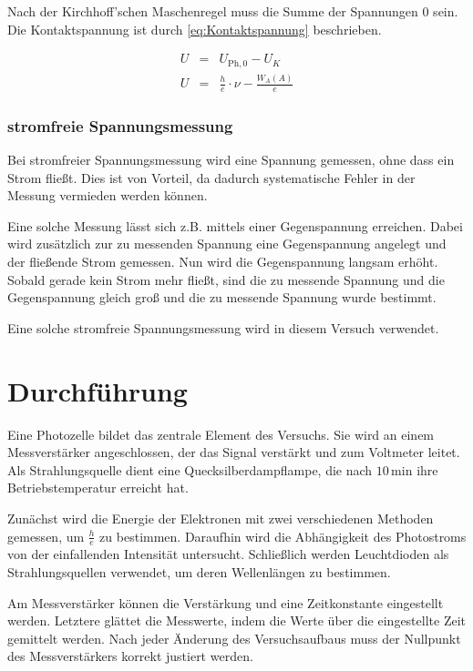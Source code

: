 \documentclass[12pt,a4paper]{scrartcl}
\numberwithin{equation}{section} %
\begin{document}
Nach der Kirchhoff'schen Maschenregel muss die Summe der Spannungen $0$ sein. Die Kontaktspannung ist durch \eqref{eq:Kontaktspannung} beschrieben.

\begin{eqnarray}
	U &=& U_{\mathrm{Ph},0}- U_K \\
	U &=& \frac{h}{e}\cdot \nu - \frac{W_A(A)}{e}  \label{eq:Stoppspannung Geradengleichung}
\end{eqnarray}

\subsubsection{stromfreie Spannungsmessung}
Bei stromfreier Spannungsmessung wird eine Spannung gemessen, ohne dass ein Strom fließt. Dies ist von Vorteil, da dadurch systematische Fehler in der Messung vermieden werden können.

Eine solche Messung lässt sich z.B. mittels einer Gegenspannung erreichen. Dabei wird zusätzlich zur zu messenden Spannung eine Gegenspannung angelegt und der fließende Strom gemessen. Nun wird die Gegenspannung langsam erhöht. Sobald gerade kein Strom mehr fließt, sind die zu messende Spannung und die Gegenspannung gleich groß und die zu messende Spannung wurde bestimmt.

Eine solche stromfreie Spannungsmessung wird in diesem Versuch verwendet.

\clearpage
\hypertarget{durchfuxfchrung}{\section{Durchführung}\label{durchfuxfchrung}}
Eine Photozelle bildet das zentrale Element des Versuchs. Sie wird an einem Messverstärker angeschlossen, der das Signal verstärkt und zum Voltmeter leitet. Als Strahlungsquelle dient eine Quecksilberdampflampe, die nach $10\mathrm{\,min}$ ihre Betriebstemperatur erreicht hat.

Zunächst wird die Energie der Elektronen mit zwei verschiedenen Methoden gemessen, um $\frac{h}{e}$ zu bestimmen. Daraufhin wird die Abhängigkeit des Photostroms von der einfallenden Intensität untersucht. Schließlich werden Leuchtdioden als Strahlungsquellen verwendet, um deren Wellenlängen zu bestimmen.

Am Messverstärker können die Verstärkung und eine Zeitkonstante eingestellt werden. Letztere glättet die Messwerte, indem die Werte über die eingestellte Zeit gemittelt werden. Nach jeder Änderung des Versuchsaufbaus muss der Nullpunkt des Messverstärkers korrekt justiert werden.
\end{document}
